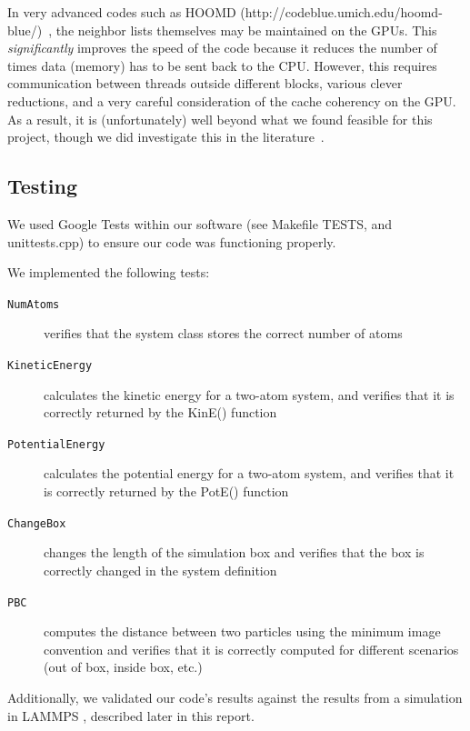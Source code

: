\documentclass[12pt]{article}
\begin{document}
In very advanced codes such as HOOMD (http://codeblue.umich.edu/hoomd-blue/)~\cite{Anderson2008}, the neighbor lists themselves may be maintained on the GPUs.  This \emph{significantly} improves the speed of the code because it reduces the number of times data (memory) has to be sent back to the CPU. However, this requires communication between threads outside different blocks, various clever reductions, and a very careful consideration of the cache coherency on the GPU.  As a result, it is (unfortunately) well beyond what we found feasible for this project, though we did investigate this in the literature~\cite{Lipscomb2012}. %

\subsection{Testing}

We used Google Tests within our software (see Makefile TESTS, and unittests.cpp) to ensure our code was functioning properly.

We implemented the following tests:
	\begin{description}
	\item[\texttt{NumAtoms}] verifies that the system class stores the correct number of atoms
	\item[\texttt{KineticEnergy}] calculates the kinetic energy for a two-atom system, and verifies that it is correctly returned by the KinE() function
	\item[\texttt{PotentialEnergy}] calculates the potential energy for a two-atom system, and verifies that it is correctly returned by the PotE() function
	\item[\texttt{ChangeBox}] changes the length of the simulation box and verifies that the box is correctly changed in the system definition
	\item[\texttt{PBC}] computes the distance between two particles using the minimum image convention and verifies that it is correctly computed for different scenarios (out of box, inside box, etc.)
	\end{description}

Additionally, we validated our code's results against the results from a simulation in LAMMPS \cite{Plimpton1995}, described later in this report.
\end{document}
